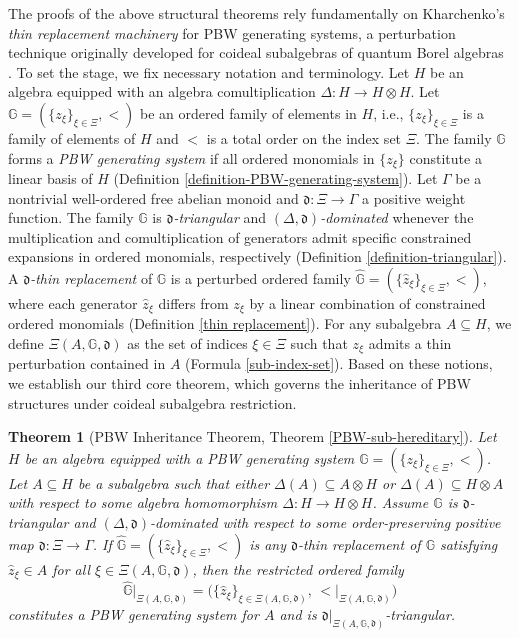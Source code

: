 \documentclass{article}
\theoremstyle{plain}
\newtheorem{thm}{Theorem}[section]
\theoremstyle{definition}
\numberwithin{equation}{section}
\newcommand{\GG}{\mathbb{G}}
\newcommand{\dd}{\mathfrak{d}}
\begin{document}
	
	The proofs of the above structural theorems rely fundamentally on Kharchenko’s \emph{thin replacement machinery} for PBW generating systems, a perturbation technique originally developed for coideal subalgebras of quantum Borel algebras \cite{Kh08,Kh11,KS08,Po09}. To set the stage, we fix necessary notation and terminology. Let $H$ be an algebra equipped with an algebra comultiplication $\Delta:H\to H\otimes H$. Let $\GG = (\{z_{\xi}\}_{\xi\in \Xi}, <)$ be an ordered family of elements in $H$, i.e., $\{z_{\xi}\}_{\xi\in \Xi}$ is a family of elements of $H$ and $<$ is a total order on the index set $\Xi$. The family $\GG$ forms a \emph{PBW generating system} if all ordered monomials in $\{z_\xi\}$ constitute a linear basis of $H$ (Definition \ref{definition-PBW-generating-system}). Let $\Gamma$ be a nontrivial well-ordered free abelian monoid and $\dd:\Xi\to\Gamma$ a positive weight function. The family $\GG$ is \emph{$\dd$-triangular} and \emph{$(\Delta,\dd)$-dominated} whenever the multiplication and comultiplication of generators admit specific constrained expansions in ordered monomials, respectively (Definition \ref{definition-triangular}). A \emph{$\dd$-thin replacement} of $\GG$ is a perturbed ordered family $\hat{\GG}=(\{\hat{z}_\xi\}_{\xi\in\Xi},<)$, where each generator $\hat{z}_\xi$ differs from $z_\xi$ by a linear combination of  constrained ordered monomials (Definition \ref{thin replacement}). For any subalgebra $A\subseteq H$, we define $\Xi(A,\GG,\dd)$  as the set of indices $\xi\in \Xi$ such that $z_{\xi}$ admits a thin perturbation contained in $A$ (Formula \eqref{sub-index-set}). Based on these notions, we establish our third core theorem, which governs the inheritance of PBW structures under coideal subalgebra restriction.
	
	
	
	
	\begin{thm}[PBW Inheritance Theorem, Theorem \ref{PBW-sub-hereditary}]\label{main-theorem-PBW-inheritance}
		Let $H$ be an algebra equipped with a PBW generating system $\mathbb{G}=(\{z_{\xi}\}_{\xi\in \Xi},<)$.
		Let $A\subseteq H$ be a subalgebra such that either $\Delta(A)\subseteq A\otimes H$ or $\Delta(A)\subseteq H\otimes A$ with respect to some algebra homomorphism $\Delta:H\to H\otimes H$.
		Assume $\mathbb{G}$ is $\dd$-triangular and $(\Delta,\dd)$-dominated with respect to some order-preserving positive map $\dd\colon \Xi\to \Gamma$.
		If $\hat{\mathbb{G}}=(\{\hat{z}_{\xi}\}_{\xi\in \Xi},<)$ is any $\dd$-thin replacement of $\mathbb{G}$ satisfying $\hat{z}_{\xi}\in A$ for all $\xi\in \Xi(A,\mathbb{G},\dd)$,
		then the restricted ordered family
		\[
		\hat{\mathbb{G}}\big|_{\Xi(A,\mathbb{G},\dd)}
		=\bigl(\{\hat{z}_{\xi}\}_{\xi\in \Xi(A,\mathbb{G},\dd)},\,{<}\big|_{\Xi(A,\mathbb{G},\dd)}\bigr)
		\]
		constitutes a PBW generating system for $A$ and is $\dd\big|_{\Xi(A,\mathbb{G},\dd)}$-triangular.
	\end{thm}
	
\end{document}
